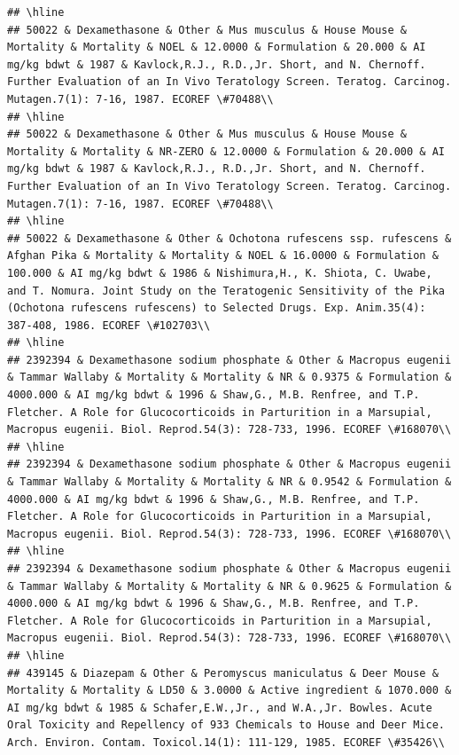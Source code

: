 \documentclass[12pt,]{article}
\begin{document}
\begin{verbatim}
## \hline
## 50022 & Dexamethasone & Other & Mus musculus & House Mouse & Mortality & Mortality & NOEL & 12.0000 & Formulation & 20.000 & AI mg/kg bdwt & 1987 & Kavlock,R.J., R.D.,Jr. Short, and N. Chernoff. Further Evaluation of an In Vivo Teratology Screen. Teratog. Carcinog. Mutagen.7(1): 7-16, 1987. ECOREF \#70488\\
## \hline
## 50022 & Dexamethasone & Other & Mus musculus & House Mouse & Mortality & Mortality & NR-ZERO & 12.0000 & Formulation & 20.000 & AI mg/kg bdwt & 1987 & Kavlock,R.J., R.D.,Jr. Short, and N. Chernoff. Further Evaluation of an In Vivo Teratology Screen. Teratog. Carcinog. Mutagen.7(1): 7-16, 1987. ECOREF \#70488\\
## \hline
## 50022 & Dexamethasone & Other & Ochotona rufescens ssp. rufescens & Afghan Pika & Mortality & Mortality & NOEL & 16.0000 & Formulation & 100.000 & AI mg/kg bdwt & 1986 & Nishimura,H., K. Shiota, C. Uwabe, and T. Nomura. Joint Study on the Teratogenic Sensitivity of the Pika (Ochotona rufescens rufescens) to Selected Drugs. Exp. Anim.35(4): 387-408, 1986. ECOREF \#102703\\
## \hline
## 2392394 & Dexamethasone sodium phosphate & Other & Macropus eugenii & Tammar Wallaby & Mortality & Mortality & NR & 0.9375 & Formulation & 4000.000 & AI mg/kg bdwt & 1996 & Shaw,G., M.B. Renfree, and T.P. Fletcher. A Role for Glucocorticoids in Parturition in a Marsupial, Macropus eugenii. Biol. Reprod.54(3): 728-733, 1996. ECOREF \#168070\\
## \hline
## 2392394 & Dexamethasone sodium phosphate & Other & Macropus eugenii & Tammar Wallaby & Mortality & Mortality & NR & 0.9542 & Formulation & 4000.000 & AI mg/kg bdwt & 1996 & Shaw,G., M.B. Renfree, and T.P. Fletcher. A Role for Glucocorticoids in Parturition in a Marsupial, Macropus eugenii. Biol. Reprod.54(3): 728-733, 1996. ECOREF \#168070\\
## \hline
## 2392394 & Dexamethasone sodium phosphate & Other & Macropus eugenii & Tammar Wallaby & Mortality & Mortality & NR & 0.9625 & Formulation & 4000.000 & AI mg/kg bdwt & 1996 & Shaw,G., M.B. Renfree, and T.P. Fletcher. A Role for Glucocorticoids in Parturition in a Marsupial, Macropus eugenii. Biol. Reprod.54(3): 728-733, 1996. ECOREF \#168070\\
## \hline
## 439145 & Diazepam & Other & Peromyscus maniculatus & Deer Mouse & Mortality & Mortality & LD50 & 3.0000 & Active ingredient & 1070.000 & AI mg/kg bdwt & 1985 & Schafer,E.W.,Jr., and W.A.,Jr. Bowles. Acute Oral Toxicity and Repellency of 933 Chemicals to House and Deer Mice. Arch. Environ. Contam. Toxicol.14(1): 111-129, 1985. ECOREF \#35426\\

\end{verbatim}
\end{document}
